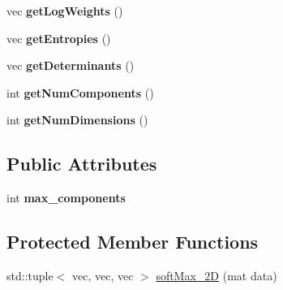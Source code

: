 \begin{DoxyCompactItemize}
\item 
vec {\bfseries get\+Log\+Weights} ()\hypertarget{classGMM_a56ffba07ec2803f25444592f275b3d31}{}\label{classGMM_a56ffba07ec2803f25444592f275b3d31}

\item 
vec {\bfseries get\+Entropies} ()\hypertarget{classGMM_a9c9d5c5fa14d84de0a0d0fd249cf705e}{}\label{classGMM_a9c9d5c5fa14d84de0a0d0fd249cf705e}

\item 
vec {\bfseries get\+Determinants} ()\hypertarget{classGMM_a060c1a9c7a363ce01d7220500fc1db2d}{}\label{classGMM_a060c1a9c7a363ce01d7220500fc1db2d}

\item 
int {\bfseries get\+Num\+Components} ()\hypertarget{classGMM_a0db6332cddaa01a06caafada3c6354c7}{}\label{classGMM_a0db6332cddaa01a06caafada3c6354c7}

\item 
int {\bfseries get\+Num\+Dimensions} ()\hypertarget{classGMM_a6e11a4916285155c0acb69beb02560bd}{}\label{classGMM_a6e11a4916285155c0acb69beb02560bd}

\end{DoxyCompactItemize}
\subsection*{Public Attributes}
\begin{DoxyCompactItemize}
\item 
int {\bfseries max\+\_\+components}\hypertarget{classGMM_af0c5335a6c9ac80c07d3212314e0d8b6}{}\label{classGMM_af0c5335a6c9ac80c07d3212314e0d8b6}

\end{DoxyCompactItemize}
\subsection*{Protected Member Functions}
\begin{DoxyCompactItemize}
\item 
std\+::tuple$<$ vec, vec, vec $>$ \hyperlink{classGMM_adfbd4c7449817315f02f54736751e1ce}{soft\+Max\+\_\+2D} (mat data)
\end{DoxyCompactItemize}
